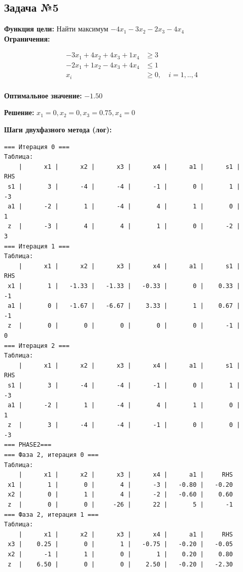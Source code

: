 \documentclass[a4paper,12pt]{article}
\begin{document}
\subsection*{Задача №5}
\textbf{Функция цели: }
Найти максимум $ -4x_{1} -3x_{2} -2x_{3} -4x_{4} $\\

\textbf{Ограничения:}

\[ \begin{aligned}
-3x_{1} +4x_{2} +4x_{3} +1x_{4} &\ge 3 \\
-2x_{1} +1x_{2} -4x_{3} +4x_{4} &\le 1 \\
x_i &\ge 0,\quad i=1,..,4\\
\end{aligned}\]

\textbf{Оптимальное значение: }$-1.50$

\textbf{Решение: }$x_{1}=0, x_{2}=0, x_{3}=0.75, x_{4}=0$

\textbf{Шаги двухфазного метода (лог):}

\begin{verbatim}
=== Итерация 0 ===
Таблица:
    |      x1 |      x2 |      x3 |      x4 |      a1 |      s1 |     RHS
 s1 |       3 |      -4 |      -4 |      -1 |       0 |       1 |      -3
 a1 |      -2 |       1 |      -4 |       4 |       1 |       0 |       1
 z  |      -3 |       4 |       4 |       1 |       0 |      -2 |       3
=== Итерация 1 ===
Таблица:
    |      x1 |      x2 |      x3 |      x4 |      a1 |      s1 |     RHS
 x1 |       1 |   -1.33 |   -1.33 |   -0.33 |       0 |    0.33 |      -1
 a1 |       0 |   -1.67 |   -6.67 |    3.33 |       1 |    0.67 |      -1
 z  |       0 |       0 |       0 |       0 |       0 |      -1 |       0
=== Итерация 2 ===
Таблица:
    |      x1 |      x2 |      x3 |      x4 |      a1 |      s1 |     RHS
 s1 |       3 |      -4 |      -4 |      -1 |       0 |       1 |      -3
 a1 |      -2 |       1 |      -4 |       4 |       1 |       0 |       1
 z  |       3 |      -4 |      -4 |      -1 |       0 |       0 |      -3
=== PHASE2===
=== Фаза 2, итерация 0 ===
Таблица:
    |      x1 |      x2 |      x3 |      x4 |      a1 |     RHS
 x1 |       1 |       0 |       4 |      -3 |   -0.80 |   -0.20
 x2 |       0 |       1 |       4 |      -2 |   -0.60 |    0.60
 z  |       0 |       0 |     -26 |      22 |       5 |      -1
=== Фаза 2, итерация 1 ===
Таблица:
    |      x1 |      x2 |      x3 |      x4 |      a1 |     RHS
 x3 |    0.25 |       0 |       1 |   -0.75 |   -0.20 |   -0.05
 x2 |      -1 |       1 |       0 |       1 |    0.20 |    0.80
 z  |    6.50 |       0 |       0 |    2.50 |   -0.20 |   -2.30
\end{verbatim}
\end{document}
